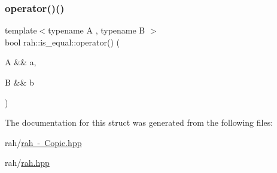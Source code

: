 \mbox{\label{structrah_1_1is__equal_a0b24ed08028993dd652bcdc7c1414745}} 
\subsubsection{\texorpdfstring{operator()()}{operator()()}\hspace{0.1cm}{\footnotesize\ttfamily [2/2]}}
{\footnotesize\ttfamily template$<$typename A , typename B $>$ \\
bool rah\+::is\+\_\+equal\+::operator() (\begin{DoxyParamCaption}\item[{A \&\&}]{a,  }\item[{B \&\&}]{b }\end{DoxyParamCaption})\hspace{0.3cm}{\ttfamily [inline]}}



The documentation for this struct was generated from the following files\+:\begin{DoxyCompactItemize}
\item 
rah/\mbox{\hyperlink{rah_01-_01_copie_8hpp}{rah -\/ Copie.\+hpp}}\item 
rah/\mbox{\hyperlink{rah_8hpp}{rah.\+hpp}}\end{DoxyCompactItemize}
